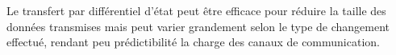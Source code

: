 Le transfert par différentiel d'état peut être efficace pour réduire la taille des 
données transmises mais peut varier grandement selon le type de changement 
effectué, rendant peu prédictibilité la charge des canaux de communication. 
%
